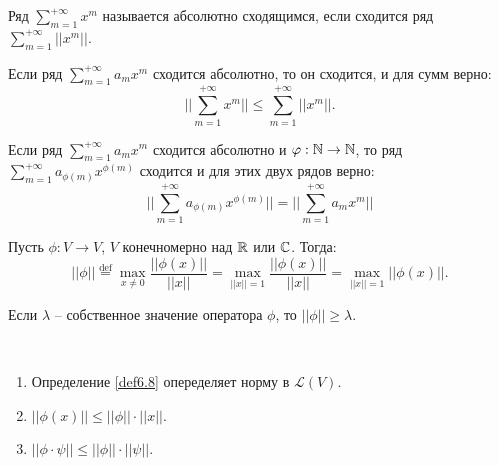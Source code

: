 \begin{definition}
    Ряд $\displaystyle\sum_{m=1}^{+\infty} x^m$ называется абсолютно сходящимся, если сходится ряд 
    $\displaystyle\sum_{m=1}^{+\infty} ||x^m||$.
\end{definition}

\begin{proposition}
    Если ряд $\displaystyle\sum_{m=1}^{+\infty} a_m x^m$ сходится абсолютно, то он сходится, 
    и для сумм верно:
    $$||\displaystyle\sum_{m=1}^{+\infty} x^m|| \leq \displaystyle\sum_{m=1}^{+\infty} ||x^m||.$$
\end{proposition}

\begin{proposition}
    Если ряд $\displaystyle\sum_{m=1}^{+\infty} a_m x^m$ сходится абсолютно и $\varphi: \mathbb{N} \to \mathbb{N}$, то 
    ряд $\displaystyle\sum_{m=1}^{+\infty} a_{\phi(m)} x^{\phi(m)}$ сходится и для этих двух рядов 
    верно: $$||\displaystyle\sum_{m=1}^{+\infty} a_{\phi(m)} x^{\phi(m)}|| = 
    ||\displaystyle\sum_{m=1}^{+\infty} a_m x^m||$$
\end{proposition}

\begin{definition}
    \label{def6.8}
    Пусть $\phi: V \to V$, $V$ конечномерно над $\mathbb{R}$ или $\mathbb{C}$. Тогда:
    $$||\phi|| \overset{\text{def}}{=} \underset{x \neq 0}{\max} \frac{||\phi(x)||}{||x||} = 
    \underset{||x|| = 1}{\max} \frac{||\phi(x)||}{||x||} = \underset{||x|| = 1}{\max} ||\phi(x)||.$$
\end{definition}

\begin{note}
    Если $\lambda$ -- собственное значение оператора $\phi$, то $||\phi|| \geq \lambda$.
\end{note}

\begin{proposition}~
    \begin{enumerate}
        \item Определение \ref{def6.8} опеределяет норму в $\mathcal{L}(V)$.
        \item $||\phi(x)|| \leq ||\phi|| \cdot ||x||$.
        \item $||\phi \cdot \psi|| \leq ||\phi|| \cdot ||\psi||$.
    \end{enumerate}
\end{proposition}

